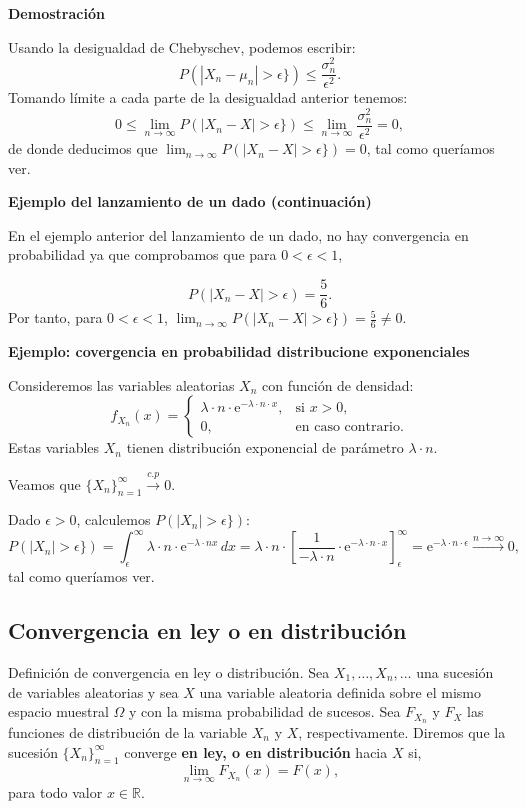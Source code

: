 \documentclass[]{book}
\begin{document}
\textbf{Demostración}

Usando la desigualdad de Chebyschev, podemos escribir:
\[
P(|X_n-\mu_n|>\epsilon \}) \leq \frac{\sigma_n^2}{\epsilon^2}.
\]
Tomando límite a cada parte de la desigualdad anterior tenemos:
\[
0\leq \lim_{n\to\infty} P(|X_n-X|>\epsilon \}) \leq \lim_{n\to\infty}\frac{\sigma_n^2}{\epsilon^2}=0,
\]
de donde deducimos que \(\lim_{n\to\infty} P(|X_n-X|>\epsilon \})=0\), tal como queríamos ver.

\textbf{Ejemplo del lanzamiento de un dado (continuación)}

En el ejemplo anterior del lanzamiento de un dado, no hay convergencia en probabilidad ya que comprobamos que para \(0<\epsilon<1\),

\[
P(|X_n-X|>\epsilon)=\frac{5}{6}.
\]
Por tanto, para \(0<\epsilon<1\), \(\lim_{n\to\infty} P(|X_n-X|>\epsilon \})=\frac{5}{6}\neq 0.\)

\textbf{Ejemplo: covergencia en probabilidad distribucione exponenciales}

Consideremos las variables aleatorias \(X_n\) con función de densidad:
\[
f_{X_n}(x)=\begin{cases}
\lambda\cdot  n\cdot\mathrm{e}^{-\lambda\cdot n\cdot  x}, & \mbox{si }x>0,\\
0, & \mbox{en caso contrario.}
\end{cases}
\]
Estas variables \(X_n\) tienen distribución exponencial de parámetro \(\lambda\cdot n\).

Veamos que \(\{X_n\}_{n=1}^\infty\stackrel{c.p}{\longrightarrow} 0\).

Dado \(\epsilon >0\), calculemos \(P(|X_n|>\epsilon \})\):
\[
P(|X_n|>\epsilon \}) = \int_\epsilon^\infty \lambda\cdot  n\cdot \mathrm{e}^{-\lambda\cdot  n x}\, dx =\lambda\cdot  n\cdot  \left[\frac{1}{-\lambda \cdot n}\cdot\mathrm{e}^{-\lambda\cdot  n\cdot  x}\right]_\epsilon^\infty =\mathrm{e}^{-\lambda\cdot  n\cdot  \epsilon}\stackrel{n\to\infty}{\longrightarrow} 0,
\]
tal como queríamos ver.

\hypertarget{convergencia-en-ley-o-en-distribuciuxf3n}{%
\subsection{Convergencia en ley o en distribución}\label{convergencia-en-ley-o-en-distribuciuxf3n}}

Definición de convergencia en ley o distribución.
Sea \(X_1,\ldots,X_n,\ldots\) una sucesión de variables aleatorias y sea \(X\) una variable aleatoria definida sobre el mismo espacio muestral \(\Omega\) y con la misma probabilidad de sucesos. Sea \(F_{X_n}\) y \(F_X\) las funciones de distribución de la variable \(X_n\) y \(X\), respectivamente. Diremos que la sucesión \(\{X_n\}_{n=1}^\infty\) converge \textbf{en ley, o en distribución} hacia \(X\) si,
\[
\lim_{n\to\infty} F_{X_n}(x)=F(x),
\]
para todo valor \(x\in\mathbb{R}\).
\end{document}
